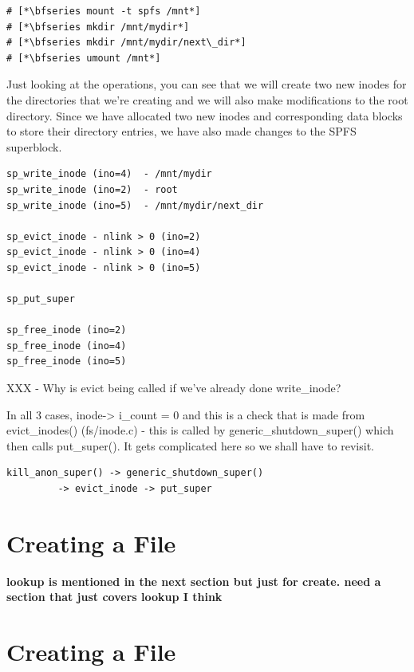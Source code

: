 \begin{lstlisting}
# [*\bfseries mount -t spfs /mnt*]
# [*\bfseries mkdir /mnt/mydir*]
# [*\bfseries mkdir /mnt/mydir/next\_dir*]
# [*\bfseries umount /mnt*]
\end{lstlisting}

\noindent
Just looking at the operations, you can see that we will create two new inodes for the directories that we're creating and we will also make modifications to the root directory. Since we have allocated two new inodes and corresponding data blocks to store their directory entries, we have also made changes to the SPFS superblock.

\begin{lstlisting}
sp_write_inode (ino=4)	- /mnt/mydir
sp_write_inode (ino=2)	- root
sp_write_inode (ino=5)	- /mnt/mydir/next_dir

sp_evict_inode - nlink > 0 (ino=2)
sp_evict_inode - nlink > 0 (ino=4)
sp_evict_inode - nlink > 0 (ino=5)

sp_put_super

sp_free_inode (ino=2)
sp_free_inode (ino=4)
sp_free_inode (ino=5)
\end{lstlisting}

\noindent
XXX - Why is evict being called if we've already done write\_inode?

In all 3 cases, inode-> i\_count = 0 and this is a check that is made from evict\_inodes() (fs/inode.c) - this is called by generic\_shutdown\_super() which then calls put\_super(). It gets complicated here so we shall have to revisit.

\begin{verbatim}
kill_anon_super() -> generic_shutdown_super() 
         -> evict_inode -> put_super
\end{verbatim}


\section{Creating a File}\label{spfs-lookup}

\textbf{lookup is mentioned in the next section but just for create. need a section that just covers lookup I think}


\section{Creating a File}\label{spfs-create-file}


